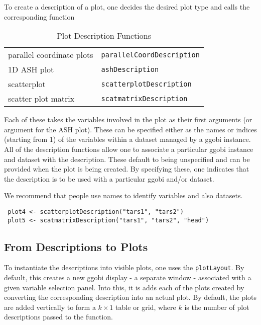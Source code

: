 \documentclass{article}
\def\SFunction#1{{\texttt{\red #1}}}
\begin{document}
To create a description of a plot, one decides the desired plot type
and calls the corresponding function
\begin{table}[htbp]
  \begin{center}
    \leavevmode
    \begin{tabular}{ll}
 parallel coordinate plots & 
\SFunction{parallelCoordDescription}
\\
 1D ASH plot & 
\SFunction{ashDescription}
\\
 scatterplot & 
\SFunction{scatterplotDescription}
\\
 scatter plot matrix & 
\SFunction{scatmatrixDescription}
\\
    \end{tabular}
    \caption{Plot Description Functions}
    \label{tab:PlotDescriptions}
  \end{center}
\end{table}
Each of these takes the variables involved in the plot as their first
arguments (or argument for the ASH plot).  These can be specified
either as the names or indices (starting from 1) of the variables
within a dataset managed by a ggobi instance.  All of the description
functions allow one to associate a particular ggobi instance and
dataset with the description.   These default to being unspecified
and can be provided when the plot is being created.
By specifying these, one indicates that
the description is to be used with a particular ggobi and/or dataset.

We recommend that people use names to identify variables
and also datasets.

\begin{verbatim}
 plot4 <- scatterplotDescription("tars1", "tars2")
 plot5 <- scatmatrixDescription("tars1", "tars2", "head")
\end{verbatim}


\subsection{From Descriptions to Plots}
To instantiate the descriptions into visible plots, one uses the
\SFunction{plotLayout}.  By default, this creates a new ggobi display
- a separate window - associated with a given variable selection
panel. Into this, it is adds each of the plots created by converting
the corresponding description into an actual plot.  By default, the
plots are added vertically to form a $k \times 1$ table or grid, where
$k$ is the number of plot descriptions passed to the function.
\end{document}
